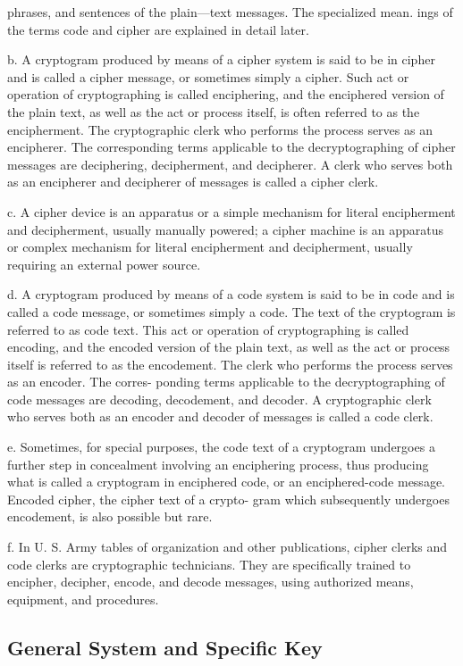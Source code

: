 phrases, and sentences of the plain—text messages. The specialized mean.
ings of the terms code and cipher are explained in detail later.

b. A cryptogram produced by means of a cipher system is said to be
in cipher and is called a cipher message, or sometimes simply a cipher.
Such act or operation of cryptographing is called enciphering, and the
enciphered version of the plain text, as well as the act or process itself,
is often referred to as the encipherment. The cryptographic clerk who
performs the process serves as an encipherer. The corresponding terms
applicable to the decryptographing of cipher messages are deciphering,
decipherment, and decipherer. A clerk who serves both as an encipherer
and decipherer of messages is called a cipher clerk.

c. A cipher device is an apparatus or a simple mechanism for literal
encipherment and decipherment, usually manually powered; a cipher
machine is an apparatus or complex mechanism for literal encipherment
and decipherment, usually requiring an external power source.

d. A cryptogram produced by means of a code system is said to be
in code and is called a code message, or sometimes simply a code. The
text of the cryptogram is referred to as code text. This act or operation
of cryptographing is called encoding, and the encoded version of the plain
text, as well as the act or process itself is referred to as the encodement.
The clerk who performs the process serves as an encoder. The corres-
ponding terms applicable to the decryptographing of code messages are
decoding, decodement, and decoder. A cryptographic clerk who serves
both as an encoder and decoder of messages is called a code clerk.

e. Sometimes, for special purposes, the code text of a cryptogram
undergoes a further step in concealment involving an enciphering process,
thus producing what is called a cryptogram in enciphered code, or an
enciphered-code message. Encoded cipher, the cipher text of a crypto-
gram which subsequently undergoes encodement, is also possible but rare.

f. In U. S. Army tables of organization and other publications, cipher
clerks and code clerks are cryptographic technicians. They are speciﬁcally
trained to encipher, decipher, encode, and decode messages, using
authorized means, equipment, and procedures.

\subsection{General System and Speciﬁc Key}

